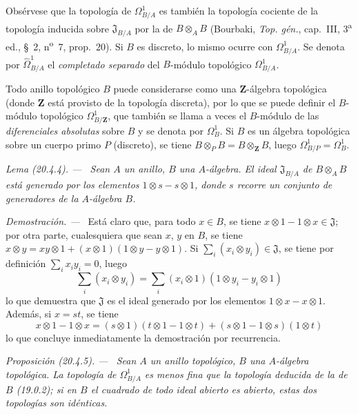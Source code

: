 \documentclass[10pt,oneside]{book}
\makeatletter
\newcommand{\setmanualcurrentlabel}[1]{\def\@currentlabel{#1}}
\newenvironment{proposition}[1][]{%
  \setmanualcurrentlabel{#1}\par\medskip\noindent\itshape Proposición (#1). ---\ }{\par}
\newenvironment{lemma}[1][]{%
  \setmanualcurrentlabel{#1}\par\medskip\noindent\itshape Lema (#1). ---\ }{\par}
\newenvironment{proof}{%
  \par\medskip\noindent\textit{Demostración. ---\ }}{\par}
\providecommand{\setmin}{-}%
\makeatother
\begin{document}
Obsérvese que la topología de $\Omega^1_{B/A}$ es también la topología cociente
de la topología inducida sobre $\mathfrak{J}_{B/A}$ por la de
$B\otimes_A B$ (Bourbaki, \emph{Top. gén.}, cap.~III, 3\textsuperscript{a}
ed., §~2, n\textsuperscript{o}~7, prop.~20). Si $B$ es discreto, lo mismo ocurre
con $\Omega^1_{B/A}$. Se denota por $\widehat{\Omega}^1_{B/A}$ el
\emph{completado separado} del $B$-módulo topológico $\Omega^1_{B/A}$.

Todo anillo topológico $B$ puede considerarse como una
$\mathbf{Z}$-álgebra topológica (donde $\mathbf{Z}$ está provisto de la topología
discreta), por lo que se puede definir el $B$-módulo topológico $\Omega^1_{B/\mathbf{Z}}$,
que también se llama a veces el $B$-módulo de las \emph{diferenciales absolutas}
sobre $B$ y se denota por $\Omega^1_B$. Si $B$ es un álgebra topológica sobre
un cuerpo primo $P$ (discreto), se tiene
$B\otimes_P B=B\otimes_{\mathbf{Z}}B$, luego
$\Omega^1_{B/P}=\Omega^1_B$.

\begin{lemma}[20.4.4]
\label{0.20.4.4-es}
Sean $A$ un anillo, $B$ una $A$-álgebra. El ideal $\mathfrak{J}_{B/A}$ de
$B\otimes_A B$ está generado por los elementos $1\otimes s\setmin s\otimes1$, donde $s$
recorre un conjunto de generadores de la $A$-álgebra $B$.
\end{lemma}

\begin{proof}
Está claro que, para todo $x\in B$, se tiene
$x\otimes1\setmin 1\otimes x\in\mathfrak{J}$; por otra parte, cualesquiera que sean $x$,
$y$ en $B$, se tiene
$x\otimes y=xy\otimes1+(x\otimes1)(1\otimes y\setmin y\otimes1)$. Si
$\sum_i(x_i\otimes y_i)\in\mathfrak{J}$, se tiene por definición
$\sum_i x_i y_i=0$, luego
\begin{equation}
\tag{20.4.4.1}
\label{0.20.4.4.1-es}
  \sum_i(x_i\otimes y_i)=
  \sum_i(x_i\otimes1)(1\otimes y_i\setmin y_i\otimes1)
\end{equation}
lo que demuestra que $\mathfrak{J}$ es el ideal generado por los elementos
$1\otimes x\setmin x\otimes1$. Además, si $x=st$, se tiene
\begin{equation}
\tag{20.4.4.2}
\label{0.20.4.4.2-es}
  x\otimes1\setmin 1\otimes x=(s\otimes1)(t\otimes1\setmin 1\otimes t)
  +(s\otimes1\setmin 1\otimes s)(1\otimes t)
\end{equation}
lo que concluye inmediatamente la demostración por recurrencia.
\end{proof}

\begin{proposition}[20.4.5]
\label{0.20.4.5-es}
Sean $A$ un anillo topológico, $B$ una $A$-álgebra topológica. La
topología de $\Omega^1_{B/A}$ es menos fina que la topología deducida de la
de $B$ (19.0.2); si en $B$ el cuadrado de todo ideal abierto es abierto, estas
dos topologías son idénticas.
\end{proposition}
\end{document}
